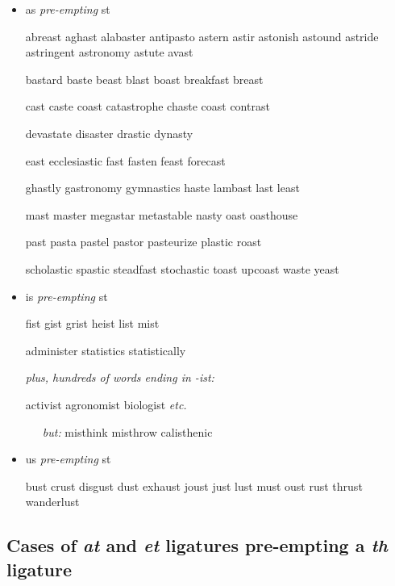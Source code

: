 \begin{itemize}
\item as \emph{pre-empting} st

abreast aghast alabaster antipasto astern astir astonish astound astride astringent astronomy astute avast

bastard baste beast blast boast breakfast breast 

cast caste coast catastrophe chaste coast contrast 

devastate disaster drastic dynasty 

east ecclesiastic fast fasten feast forecast 

ghastly gastronomy gymnastics haste lambast last least 

mast master megastar metastable nasty oast oasthouse

past pasta pastel pastor pasteurize plastic roast 

scholastic spastic steadfast stochastic toast upcoast waste yeast

\item is \emph{pre-empting} st

fist gist grist heist list mist 

administer statistics statistically

\emph{plus, \emph{hundreds} of words ending in -ist:}

activist agronomist biologist \emph{etc.}

\ \ \ \emph{but:} misthink misthrow calisthenic



\item us \emph{pre-empting} st

bust crust disgust dust exhaust joust just lust must oust rust thrust wanderlust


\end{itemize}
\egroup


\subsection*{Cases of \emph{at} and \emph{et} ligatures pre-empting a \emph{th} ligature}

